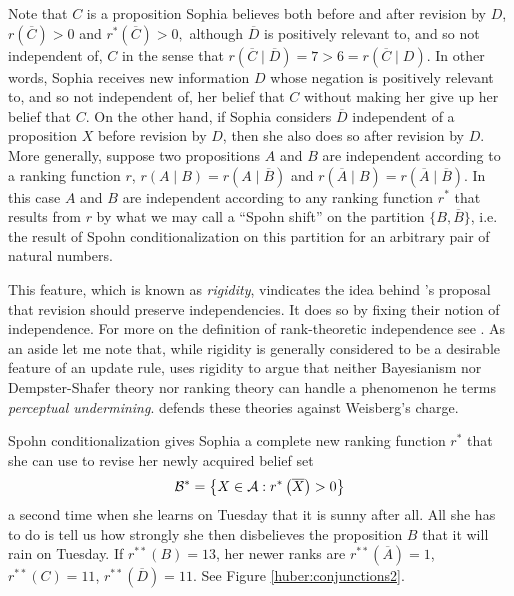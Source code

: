 Note that $C$ is a proposition Sophia believes both before and after revision by $D$, $r(\overline{C})>0$
and $r^*(\overline{C})>0,$ although $\overline{D}$ is positively relevant to, and so not independent of, $C$ in the sense that $r(\overline{C}\mid\overline{D})=7>6=r(\overline{C}\mid D).$ In other words, Sophia receives new information $D$ whose negation is positively relevant to, and so not independent of, her belief that $C$ without making her give up her belief that $C$. On the other hand, if Sophia considers $\overline{D}$ independent of a proposition $X$ before revision by $D$, %
then she also does so after revision by $D$. %
More generally, suppose two propositions $A$ and $B$ are independent according to a ranking function $r$,
$r(A\mid B)=r(A\mid\overline{B})$ and $r(\overline{A}\mid B)=r(\overline{A}\mid\overline{B})$. In this case $A$ and $B$ are independent according to any ranking function $r^*$ that results from $r$ by what we may call a ``Spohn shift'' on the partition $\{B,\overline{B}\}$, i.e. the result of Spohn conditionalization on this partition for an arbitrary pair of natural numbers.

This feature, which is known as \emph{rigidity}, vindicates the idea behind \citet{jt07}'s proposal that revision should preserve independencies. It does so by fixing their notion of independence. For more on the definition of rank-theoretic independence see \citet{s99}. As an aside let me note that, while rigidity is generally considered to be a desirable feature of an update rule, \citet{w09, w15} uses rigidity to argue that neither Bayesianism nor Dempster-Shafer theory \citep{h09} nor ranking theory can handle a phenomenon he terms \emph{perceptual undermining}. \citet{h14a} defends these theories against Weisberg's charge.

Spohn conditionalization gives Sophia a complete new ranking function $r^*$ that she can use to revise her newly acquired belief set
$$\begin{cal}B\end{cal}^*=\left\{X\in\begin{cal}A\end{cal}: r^*\left(\overline{X}\right)>0\right\}$$
a second time when she learns on Tuesday that it is sunny after all. All she has to do is tell us how strongly she then disbelieves the proposition $B$ that it will rain on Tuesday. If $r^{**}\left(B\right)=13$, her newer ranks are $r^{**}(\overline{A})=1$, $r^{**}(C)=11$, $r^{**}(\overline{D})=11$. See Figure \ref{huber:conjunctions2}.


